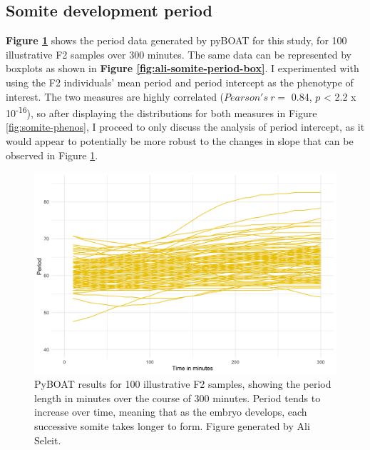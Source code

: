 \documentclass[
]{book}
\begin{document}
\hypertarget{somite-development-period}{%
\subsection{Somite development period}\label{somite-development-period}}

\textbf{Figure \ref{fig:ali-somite-period-lines}} shows the period data generated by pyBOAT for this study, for 100 illustrative F2 samples over 300 minutes. The same data can be represented by boxplots as shown in \textbf{Figure \ref{fig:ali-somite-period-box}}. I experimented with using the F2 individuals' mean period and period intercept as the phenotype of interest. The two measures are highly correlated (\(Pearson's~r =\) 0.84, \(p\) \textless{} 2.2 x 10\textsuperscript{-16}), so after displaying the distributions for both measures in Figure \ref{fig:somite-phenos}, I proceed to only discuss the analysis of period intercept, as it would appear to potentially be more robust to the changes in slope that can be observed in Figure \ref{fig:ali-somite-period-lines}.



\begin{figure}
\includegraphics[width=1\linewidth]{figs/somites/ali_period_lines_100fish300mins} \caption{PyBOAT results for 100 illustrative F2 samples, showing the period length in minutes over the course of 300 minutes. Period tends to increase over time, meaning that as the embryo develops, each successive somite takes longer to form. Figure generated by Ali Seleit.}\label{fig:ali-somite-period-lines}
\end{figure}
\end{document}
